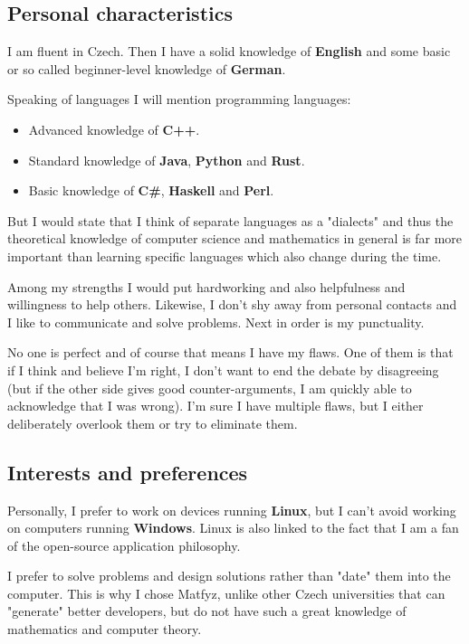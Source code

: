 \documentclass{article}
\begin{document}
\subsection*{Personal characteristics}

I am fluent in Czech. Then I have a solid knowledge of \textbf{English} and some basic or so called beginner-level knowledge of \textbf{German}.

Speaking of languages I will mention programming languages:

\begin{itemize}
	\item Advanced knowledge of \textbf{C++}.
	\item Standard knowledge of \textbf{Java}, \textbf{Python} and \textbf{Rust}.
	\item Basic knowledge of \textbf{C\#}, \textbf{Haskell} and \textbf{Perl}.
\end{itemize}

But I would state that I think of separate languages as a "dialects" and thus the theoretical knowledge of computer science and mathematics in general is far more important than learning specific languages which also change during the time.

Among my strengths I would put hardworking and also helpfulness and willingness to help others. Likewise, I don't shy away from personal contacts and I like to communicate and solve problems. Next in order is my punctuality.

No one is perfect and of course that means I have my flaws. One of them is that if I think and believe I'm right, I don't want to end the debate by disagreeing (but if the other side gives good counter-arguments, I am quickly able to acknowledge that I was wrong). I'm sure I have multiple flaws, but I either deliberately overlook them or try to eliminate them.

\subsection*{Interests and preferences}

Personally, I prefer to work on devices running \textbf{Linux}, but I can't avoid working on computers running \textbf{Windows}. Linux is also linked to the fact that I am a fan of the open-source application philosophy.

I prefer to solve problems and design solutions rather than "date" them into the computer. This is why I chose Matfyz, unlike other Czech universities that can "generate" better developers, but do not have such a great knowledge of mathematics and computer theory.
\end{document}
